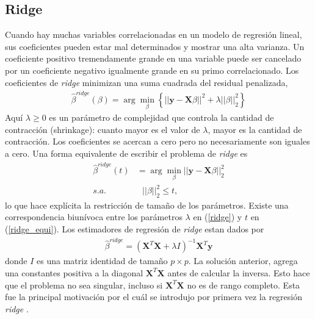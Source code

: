 \documentclass{article}
\newcommand{\X}{\mathbf{X}}
\newcommand{\y}{\mathbf{y}}
\begin{document}
\subsection{Ridge}
Cuando hay muchas variables correlacionadas en un modelo de regresión lineal, sus coeficientes pueden estar mal determinados y mostrar una alta varianza. Un coeficiente positivo tremendamente grande en una variable puede ser cancelado por un coeficiente negativo igualmente grande en su primo correlacionado. Los coeficientes de \textit{ridge} minimizan una suma cuadrada del residual penalizada, 
\begin{align} \label{ridge}
\hat{\beta}^{ridge}(\beta) = \arg \min_{\beta} \left\{||\y- \X \beta||^2+\lambda||\beta||_2^2 \right\}
\end{align}
Aquí $\lambda\geq 0$ es un parámetro de complejidad que controla la cantidad de contracción (shrinkage): cuanto mayor es el valor de $\lambda$, mayor es la cantidad de contracción. Los coeficientes se acercan a cero pero no necesariamente son iguales a cero. Una forma equivalente de escribir el problema de \textit{ridge} es
\begin{align}\label{ridge_equi}
    \hat{\beta}^{ridge}(t) &= \arg \min_{\beta} ||\y-\X\beta||_2^2\\
    s.a.&\ \ \  ||\beta||_2^2\leq t,
\end{align}
lo que hace explícita la restricción de tamaño de los parámetros. Existe una correspondencia biunívoca entre los parámetros $\lambda$ en (\ref{ridge}) y $t$ en (\ref{ridge_equi}). Los estimadores de regresión de \textit{ridge} estan dados por 
\begin{align*}
    \hat{\beta}^{ridge} = (\X^T\X+\lambda I)^{-1}\X^T\y
\end{align*}
donde $I$ es una matriz identidad de tamaño $p \times p$. La solución anterior, agrega una constantes positiva a la diagonal $\X^T\X$ antes de calcular la inversa. Esto hace que el problema no sea singular, incluso si $\X^T \X$ no es de rango completo. Esta fue la principal motivación por el cuál se introdujo por primera vez la regresión \textit{ridge} \citep{ridge}.
\end{document}
